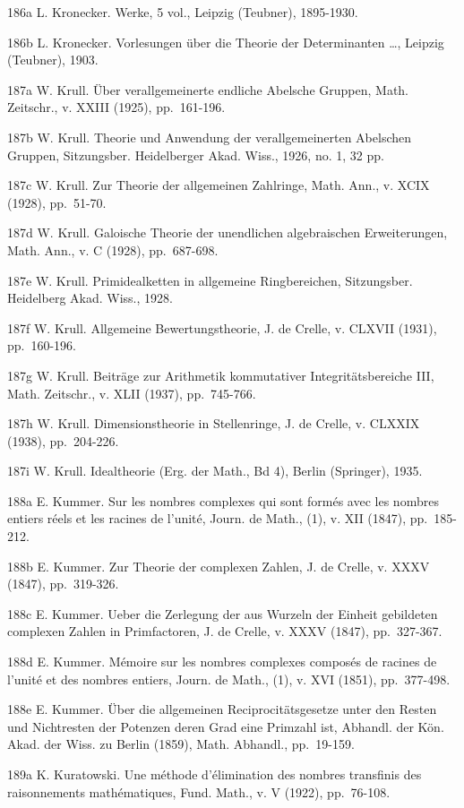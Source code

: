186a L. Kronecker. Werke, 5 vol., Leipzig (Teubner), 1895-1930.

186b L. Kronecker. Vorlesungen über die Theorie der Determinanten \ldots, Leipzig (Teubner), 1903.

187a W. Krull. Über verallgemeinerte endliche Abelsche Gruppen, Math. Zeitschr., v. XXIII (1925), pp.~161-196.

187b W. Krull. Theorie und Anwendung der verallgemeinerten Abelschen Gruppen, Sitzungsber. Heidelberger Akad. Wiss., 1926, no. 1, 32 pp.

187c W. Krull. Zur Theorie der allgemeinen Zahlringe, Math. Ann., v. XCIX (1928), pp.~51-70.

187d W. Krull. Galoische Theorie der unendlichen algebraischen Erweiterungen, Math. Ann., v. C (1928), pp.~687-698.

187e W. Krull. Primidealketten in allgemeine Ringbereichen, Sitzungsber. Heidelberg Akad. Wiss., 1928.

187f W. Krull. Allgemeine Bewertungstheorie, J. de Crelle, v. CLXVII (1931), pp.~160-196.

187g W. Krull. Beiträge zur Arithmetik kommutativer Integritätsbereiche III, Math. Zeitschr., v. XLII (1937), pp.~745-766.

187h W. Krull. Dimensionstheorie in Stellenringe, J. de Crelle, v. CLXXIX (1938), pp.~204-226.

187i W. Krull. Idealtheorie (Erg. der Math., Bd 4), Berlin (Springer), 1935.

188a E. Kummer. Sur les nombres complexes qui sont formés avec les nombres entiers réels et les racines de l'unité, Journ. de Math., (1), v. XII (1847), pp.~185-212.

188b E. Kummer. Zur Theorie der complexen Zahlen, J. de Crelle, v. XXXV (1847), pp.~319-326.

188c E. Kummer. Ueber die Zerlegung der aus Wurzeln der Einheit gebildeten complexen Zahlen in Primfactoren, J. de Crelle, v. XXXV (1847), pp.~327-367.

188d E. Kummer. Mémoire sur les nombres complexes composés de racines de l'unité et des nombres entiers, Journ. de Math., (1), v. XVI (1851), pp.~377-498.

188e E. Kummer. Über die allgemeinen Reciprocitätsgesetze unter den Resten und Nichtresten der Potenzen deren Grad eine Primzahl ist, Abhandl. der Kön. Akad. der Wiss. zu Berlin (1859), Math. Abhandl., pp.~19-159.

189a K. Kuratowski. Une méthode d'élimination des nombres transfinis des raisonnements mathématiques, Fund. Math., v. V (1922), pp.~76-108.

